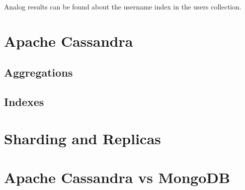 Analog results can be found about the username index in the users collection.

\section{Apache Cassandra}

\subsection{Aggregations}
\subsection{Indexes}

\section{Sharding and Replicas}

\section{Apache Cassandra vs MongoDB}
